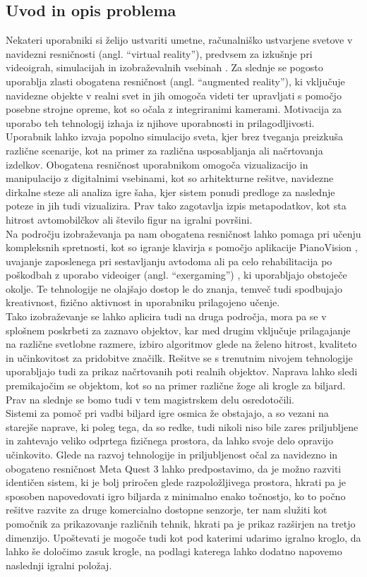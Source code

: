 \documentclass[a4paper, 12pt]{article}
\begin{document}
\subsection{Uvod in opis problema}
Nekateri uporabniki si želijo ustvariti umetne, računalniško ustvarjene svetove v navidezni resničnosti (angl. ``virtual reality''), predvsem za izkušnje pri videoigrah, simulacijah in izobraževalnih vsebinah \cite{Qingtian2024}. Za slednje se pogosto uporablja zlasti obogatena resničnost (angl. ``augmented reality''), ki vključuje navidezne objekte v realni svet in jih omogoča videti ter upravljati s pomočjo posebne strojne opreme, kot so očala z integriranimi kamerami.
Motivacija za uporabo teh tehnologij izhaja iz njihove uporabnosti in prilagodljivosti. Uporabnik lahko izvaja popolno simulacijo sveta, kjer brez tveganja preizkuša različne scenarije, kot na primer za različna usposabljanja ali načrtovanja izdelkov. Obogatena resničnost uporabnikom omogoča vizualizacijo in manipulacijo z digitalnimi vsebinami, kot so arhitekturne rešitve, navidezne dirkalne steze ali analiza igre šaha, kjer sistem ponudi predloge za naslednje poteze in jih tudi vizualizira. Prav tako zagotavlja izpis metapodatkov, kot sta hitrost avtomobilčkov ali število figur na igralni površini.\\
Na področju izobraževanja pa nam obogatena resničnost lahko pomaga pri učenju kompleksnih spretnosti, kot so igranje klavirja s pomočjo aplikacije PianoVision \cite{McKenzie2022PianoVision}, uvajanje zaposlenega pri sestavljanju avtodoma ali pa celo rehabilitacija po poškodbah z uporabo videoiger (angl. ``exergaming'') \cite{Chow2023Exergaming}, ki uporabljajo obstoječe okolje. Te tehnologije ne olajšajo dostop le do znanja, temveč tudi spodbujajo kreativnost, fizično aktivnost in uporabniku prilagojeno učenje.\\
Tako izobraževanje se lahko aplicira tudi na druga področja, mora pa se v splošnem poskrbeti za zaznavo objektov, kar med drugim vključuje prilagajanje na različne svetlobne razmere, izbiro algoritmov glede na želeno hitrost, kvaliteto in učinkovitost za pridobitve značilk. Rešitve se s trenutnim nivojem tehnologije uporabljajo tudi za prikaz načrtovanih poti realnih objektov. Naprava lahko sledi premikajočim se objektom, kot so na primer različne žoge ali krogle za biljard. Prav na slednje se bomo tudi v tem magistrskem delu osredotočili.
\\Sistemi za pomoč pri vadbi biljard igre osmica že obstajajo, a so vezani na starejše naprave, ki poleg tega, da so redke, tudi nikoli niso bile zares priljubljene \cite{Sousa2016} in zahtevajo veliko odprtega fizičnega prostora, da lahko svoje delo opravijo učinkovito. Glede na razvoj tehnologije in priljubljenost očal za navidezno in obogateno resničnost Meta Quest 3 lahko predpostavimo, da je možno razviti identičen sistem, ki je bolj priročen glede razpoložljivega prostora, hkrati pa je sposoben napovedovati igro biljarda z minimalno enako točnostjo, ko to počno rešitve razvite za druge komercialno dostopne senzorje, ter nam služiti kot pomočnik za prikazovanje različnih tehnik, hkrati pa je prikaz razširjen na tretjo dimenzijo. Upoštevati je mogoče tudi kot pod katerimi udarimo igralno kroglo, da lahko še določimo zasuk krogle, na podlagi katerega lahko dodatno napovemo naslednji igralni položaj. 
\end{document}
